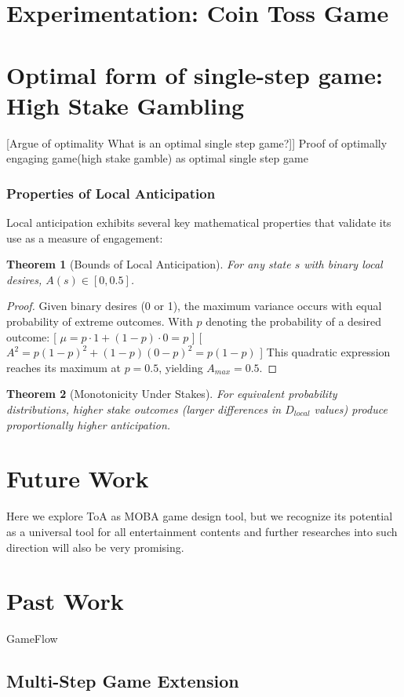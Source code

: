 \documentclass{article}
\newtheorem{theorem}{Theorem}[]
\begin{document}
\section{Experimentation: Coin Toss Game}
\section{Optimal form of single-step game: High Stake Gambling}
[Argue of optimality What is an optimal single step game?]]
Proof of optimally engaging game(high stake gamble) as optimal single step game

\subsubsection{Properties of Local Anticipation}
Local anticipation exhibits several key mathematical properties that validate its use as a measure of engagement:
\begin{theorem}[Bounds of Local Anticipation]
For any state $s$ with binary local desires, $A(s) \in [0, 0.5]$.
\end{theorem}
\begin{proof}
Given binary desires (0 or 1), the maximum variance occurs with equal probability of extreme outcomes. With $p$ denoting the probability of a desired outcome:
[
$\mu = p \cdot 1 + (1-p) \cdot 0 = p$
]
[
$A^2 = p(1-p)^2 + (1-p)(0-p)^2 = p(1-p)$
]
This quadratic expression reaches its maximum at $p=0.5$, yielding $A_{max}=0.5$.
\end{proof}
\begin{theorem}[Monotonicity Under Stakes]
For equivalent probability distributions, higher stake outcomes (larger differences in $D_{local}$ values) produce proportionally higher anticipation.
\end{theorem}

\section{Future Work}
Here we explore ToA as MOBA game design tool, but we recognize its potential as a universal tool for all entertainment contents and further researches into such direction will also be very promising.

\section{Past Work}
GameFlow


\subsection{Multi-Step Game Extension}
\end{document}
